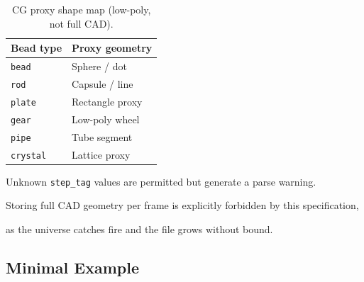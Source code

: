 \documentclass[12pt, a4paper, oneside]{article}
\begin{document}
\begin{table}[htbp]

  \centering

  \caption{CG proxy shape map (low-poly, not full CAD).}

  \label{tab:xyzfull_proxy}

  \begin{tabular}{ll}

    \toprule

    Bead type & Proxy geometry \\

    \midrule

    \texttt{bead}    & Sphere / dot \\

    \texttt{rod}     & Capsule / line \\

    \texttt{plate}   & Rectangle proxy \\

    \texttt{gear}    & Low-poly wheel \\

    \texttt{pipe}    & Tube segment \\

    \texttt{crystal} & Lattice proxy \\

    \bottomrule

  \end{tabular}

\end{table}


Unknown \texttt{step\_tag} values are permitted but generate a parse warning.

Storing full CAD geometry per frame is explicitly forbidden by this specification,

as the universe catches fire and the file grows without bound.


\subsection{Minimal Example}
\end{document}
